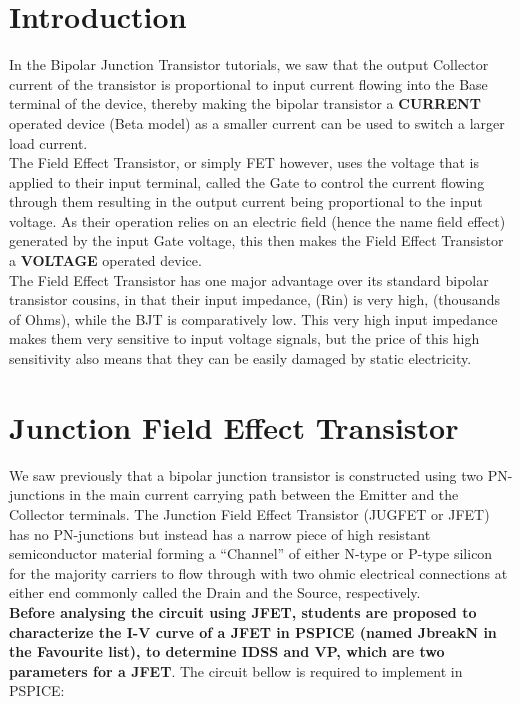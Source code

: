 
\section{Introduction}
In the Bipolar Junction Transistor  tutorials, we saw that the output Collector current of the transistor is proportional to input current flowing into the Base terminal of the device, thereby making the bipolar transistor a \textbf{CURRENT} operated device (Beta model) as a smaller current can be used to switch a larger load current.\\

The Field Effect Transistor, or simply FET however, uses the voltage that is applied to their input terminal, called the Gate to control the current flowing through them resulting in the output current being proportional to the input voltage. As their operation relies on an electric field (hence the name field effect) generated by the input Gate voltage, this then makes the Field Effect Transistor a \textbf{VOLTAGE} operated device.\\

The Field Effect Transistor has one major advantage over its standard bipolar transistor cousins, in that their input impedance, (Rin) is very high, (thousands of Ohms), while the BJT is comparatively low. This very high input impedance makes them very sensitive to input voltage signals, but the price of this high sensitivity also means that they can be easily damaged by static electricity.

\section{Junction Field Effect Transistor}
We saw previously that a bipolar junction transistor is constructed using two PN-junctions in the main current carrying path between the Emitter and the Collector terminals. The Junction Field Effect Transistor (JUGFET or JFET) has no PN-junctions but instead has a narrow piece of high resistant semiconductor material forming a ``Channel'' of either N-type or P-type silicon for the majority carriers to flow through with two ohmic electrical connections at either end commonly called the Drain and the Source, respectively.\\

\textbf{Before analysing the circuit using JFET, students are proposed to characterize the I-V curve of a JFET in PSPICE (named \textbf{JbreakN in the Favourite list}), to determine IDSS and VP, which are two parameters for a JFET}. The circuit bellow is required to implement in PSPICE:

